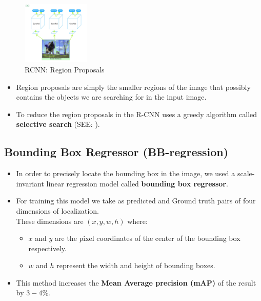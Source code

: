\begin{table}[H]
    \begin{minipage}[t]{0.49\linewidth}
        \begin{figure}[H]
            \centering
            \includegraphics[width=\linewidth, height=3cm, keepaspectratio]{Pictures/convolutional-neural-network/rcnn-region-proposals.jpg}
            \caption{RCNN: Region Proposals}
        \end{figure}        
    \end{minipage}
    \hfill
    \begin{minipage}[t]{0.49\linewidth}
        \begin{itemize}
            \item Region proposals are simply the smaller regions of the image that possibly contains the objects we are searching for in the input image.
        
            \item To reduce the region proposals in the R-CNN uses a greedy algorithm called \textbf{selective search} (SEE: ).
        \end{itemize}
    \end{minipage}
\end{table}


\subsection{Bounding Box Regressor (BB-regression) \cite{https://www.geeksforgeeks.org/r-cnn-region-based-cnns/}}\label{Bounding Box Regressor (BB-regression)}

\begin{itemize}
    \item In order to precisely locate the bounding box in the image, we used a scale-invariant linear regression model called \textbf{bounding box regressor}.

    \item For training this model we take as predicted and Ground truth pairs of four dimensions of localization.\\
    These dimensions are $(x, y, w, h)$ where:
    \begin{itemize}
        \item $x$ and $y$ are the pixel coordinates of the center of the bounding box respectively. 

        \item $w$ and $h$ represent the width and height of bounding boxes.
    \end{itemize}
    
    \item This method increases the \textbf{Mean Average precision (mAP)} of the result by $3-4\%$.
    
\end{itemize}



